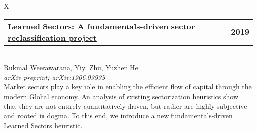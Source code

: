\documentclass[10pt]{article}
\newcommand{\tabularxwidth}{\textwidth}
\newcommand{\changeurlcolor}[1]{\hypersetup{urlcolor=#1}}
\begin{document}
    
        \begin{minipage}{\tabularxwidth}
        \begin{tabularx}{\tabularxwidth}{X}
            {
                \begin{tabularx}{\tabularxwidth}{@{}X r}
                    \textbf{\changeurlcolor{black}\href{https://arxiv.org/abs/1906.03935}{Learned Sectors: A fundamentals-driven sector reclassification project}} &
                    \textbf{
        2019} \\
                \end{tabularx}
            } \\
            Rukmal Weerawarana, Yiyi Zhu, Yuzhen He \\

            
                \textit{arXiv preprint; arXiv:1906.03935} \\
            
            

            
    Market sectors play a key role in enabling the efficient flow of capital through the modern Global economy. An analysis of existing sectorization heuristics show that they are not entirely quantitatively driven, but rather are highly subjective and rooted in dogma. To this end, we introduce a new fundamentals-driven Learned Sectors heuristic.
        \end{tabularx}

        
            \vspace{.3em}
        

        \end{minipage}
    
\end{document}
